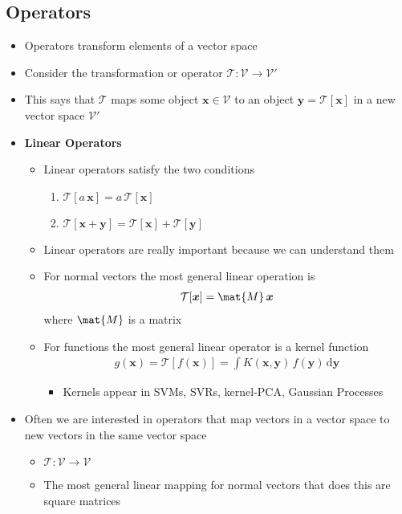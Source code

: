 \documentclass[11pt]{article}
\newcommand{\dd}{\mathrm{d}}
\begin{document}
\subsection{Operators}
\label{sec:orgc113393}
\begin{itemize}
\item Operators transform elements of a vector space
\item Consider the transformation or operator \(\mathcal{T}: \mathcal{V} \rightarrow \mathcal{V}'\)
\item This says that \(\mathcal{T}\) maps some object
\(\bm{x}\in\mathcal{V}\) to an object \(\bm{y}=\mathcal{T}[\bm{x}]\)
in a new vector space \(\mathcal{V}'\)
\item \textbf{Linear Operators}
\begin{itemize}
\item Linear operators satisfy the two conditions
\begin{enumerate}
\item \(\mathcal{T}[a\,\bm{x}] = a\,\mathcal{T}[\bm{x}]\)
\item \(\mathcal{T}[\bm{x} + \bm{y}] = \mathcal{T}[\bm{x}] + \mathcal{T}[\bm{y}]\)
\end{enumerate}
\item Linear operators are really important because we can understand them
\item For normal vectors the most general linear operation is
\begin{align*}
  \mathcal{T}[\bm{x}] = \mat{M}\,\bm{x}
\end{align*}
where \(\mat{M}\) is a matrix
\item For functions the most general linear operator is a kernel function
\begin{align*}
   g(\bm{x}) = \mathcal{T}[f(\bm{x})] = \int
   K(\bm{x},\bm{y})\, f(\bm{y}) \, \dd \bm{y}
\end{align*}
\begin{itemize}
\item Kernels appear in SVMs, SVRs, kernel-PCA, Gaussian Processes
\end{itemize}
\end{itemize}
\item Often we are interested in operators that map vectors in a vector space to new
vectors in the same vector space
\begin{itemize}
\item \(\mathcal{T}: \mathcal{V}\rightarrow\mathcal{V}\)
\item The most general linear mapping for normal vectors that does this are square matrices
\end{itemize}
\end{itemize}
\end{document}
